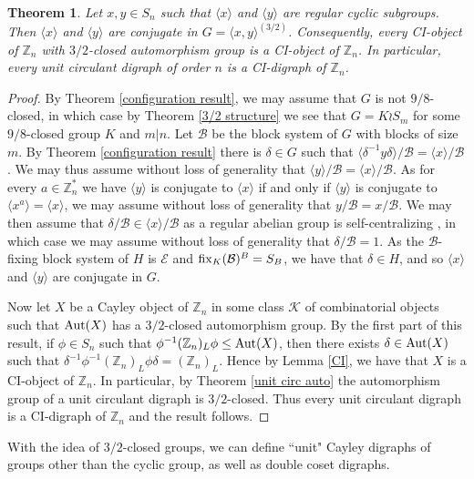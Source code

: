 \documentclass{amsart}
\newtheorem{thrm}{Theorem}[section]
\theoremstyle{definition}
\theoremstyle{remark}
\numberwithin{equation}{section}
\def\Z{{\mathbb Z}}
\def\la{{\langle}}
\def\ra{{\rangle}}
\def\fix{{\rm fix}}
\def\Aut{{\rm Aut}}
\def\cal{\mathcal}
\begin{document}
\begin{thrm}\label{Toida generalization}
Let $x,y\in S_n$ such that $\la x\ra$ and $\la y\ra$ are regular cyclic subgroups.  Then $\la x\ra$ and $\la y\ra$ are conjugate in $G = \la x,y\ra^{(3/2)}$.  Consequently, every CI-object of $\Z_n$ with $3/2$-closed automorphism group is a CI-object of $\Z_n$.  In particular, every unit circulant digraph of order $n$ is a CI-digraph of $\Z_n$.
\end{thrm}

\begin{proof}
By Theorem \ref{configuration result}, we may assume that $G$ is not $9/8$-closed, in which case by Theorem \ref{3/2 structure} we see that $G = K\wr S_m$ for some $9/8$-closed group $K$ and $m\vert n$.  Let ${\cal B}$ be the block system of $G$ with blocks of size $m$.  By Theorem \ref{configuration result} there is $\delta\in G$ such that $\la\delta^{-1}y\delta\ra/{\cal B} = \la x\ra/{\cal B}$.  We may thus assume without loss of generality that $\la y\ra/{\cal B} = \la x\ra/{\cal B}$.  As for every $a\in\Z_n^*$ we have $\la y\ra$ is conjugate to $\la x\ra$ if and only if $\la y\ra$ is conjugate to $\la x^a\ra = \la x\ra$, we may assume without loss of generality that $y/{\cal B} = x/{\cal B}$.  We may then assume that $\delta/{\cal B}\in\la x\ra/{\cal B}$ as a regular abelian group is self-centralizing \cite[Corollary 2.2.18]{Book}, in which case we may assume without loss of generality that $\delta/{\cal B} = 1$.  As the ${\cal B}$-fixing block system of $H$ is ${\cal E}$ and $\fix_K({\cal B})^B = S_B$, we have that $\delta\in H$, and so $\la x\ra$ and $\la y\ra$ are conjugate in $G$.

Now let $X$ be a Cayley object of $\Z_n$ in some class ${\cal K}$ of combinatorial objects such that $\Aut(X)$ has a $3/2$-closed automorphism group.  By the first part of this result, if $\phi\in S_n$ such that $\phi^{-1}(\Z_n)_L\phi\le\Aut(X)$, then there exists $\delta\in\Aut(X)$ such that $\delta^{-1}\phi^{-1}(\Z_n)_L\phi\delta = (\Z_n)_L$.  Hence by Lemma \ref{CI}, we have that $X$ is a CI-object of $\Z_n$.  In particular, by Theorem \ref{unit circ auto} the automorphism group of a unit circulant digraph is $3/2$-closed.  Thus every unit circulant digraph is a CI-digraph of $\Z_n$ and the result follows.
\end{proof}

With the idea of $3/2$-closed groups, we can define ``unit" Cayley digraphs of groups other than the cyclic group, as well as double coset digraphs.
\end{document}
